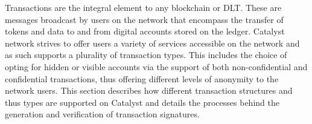 Transactions are the integral element to any blockchain or DLT. These are messages broadcast by users on the network that encompass the transfer of tokens and data to and from digital accounts stored on the ledger. Catalyst network strives to offer users a variety of services accessible on the network and as such supports a plurality of transaction types. This includes the choice of opting for hidden or visible accounts via the support of both non-confidential and confidential transactions, thus offering different levels of anonymity to the network users. This section describes how different transaction structures and thus types are supported on Catalyst and details the processes behind the generation and verification of transaction signatures. 